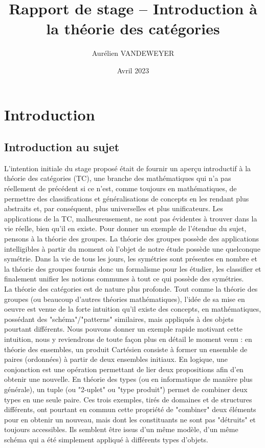 \documentclass{article}
\title{Rapport de stage -- Introduction à la théorie des catégories}
\author{Aurélien VANDEWEYER}
\date{Avril 2023}
\begin{document}
\maketitle
\newpage
\tableofcontents
\newpage

\section{Introduction}
\subsection{Introduction au sujet}

L'intention initiale du stage proposé était de fournir un aperçu introductif à la théorie des catégories (TC), une branche des mathématiques qui n'a pas réellement de précédent si ce n'est, comme toujours en mathématiques, de permettre des classifications et généralisations de concepts en les rendant plus abstraits et, par conséquent, plus universelles et plus unificateurs. Les applications de la TC, malheureusement, ne sont pas évidentes à trouver dans la vie réelle, bien qu'il en existe. Pour donner un exemple de l'étendue du sujet, pensons à la théorie des groupes. La théorie des groupes possède des applications intelligibles à partir du moment où l'objet de notre étude possède une quelconque symétrie. Dans la vie de tous les jours, les symétries sont présentes en nombre et la théorie des groupes fournis donc un formalisme pour les étudier, les classifier et finalement unifier les notions communes à tout ce qui possède des symétries.\\

La théorie des catégories est de nature plus profonde. Tout comme la théorie des groupes (ou beaucoup d'autres théories mathématiques), l'idée de sa mise en oeuvre est venue de la forte intuition qu'il existe des concepts, en mathématiques, possédant des "schéma"/"patterns" similaires, mais appliqués à des objets pourtant différents. Nous pouvons donner un exemple rapide motivant cette intuition, nous y reviendrons de toute façon plus en détail le moment venu : en théorie des ensembles, un produit Cartésien consiste à former un ensemble de paires (ordonnées) à partir de deux ensembles initiaux. En logique, une conjonction est une opération permettant de lier deux propositions afin d'en obtenir une nouvelle. En théorie des types (ou en informatique de manière plus générale), un tuple (ou "2-uplet" ou "type produit") permet de combiner deux types en une seule paire. Ces trois exemples, tirés de domaines et de structures différents, ont pourtant en commun cette propriété de "combiner" deux éléments pour en obtenir un nouveau, mais dont les constituants ne sont pas "détruits" et toujours accessibles. Ils semblent être issus d'un même modèle, d'un même schéma qui a été simplement appliqué à différents types d'objets.\\
\end{document}
